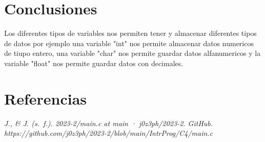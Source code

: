 \documentclass{article}
\begin{document}
\newpage

\section{Conclusiones}

Los diferentes tipos de variables nos permiten tener y almacenar diferentes tipos de datos por ejemplo una variable "int" nos permite almacenar datos numericos de tiupo entero, una variable "char" nos permite guardar datos alfanumericos y la variable "float" nos permite guardar datos con decimales.

\newpage

\section{Referencias}

\textit{J., & J. (s. f.). 2023-2/main.c at main · j0z3ph/2023-2. GitHub. https://github.com/j0z3ph/2023-2/blob/main/IntrProg/C4/main.c}
\end{document}
